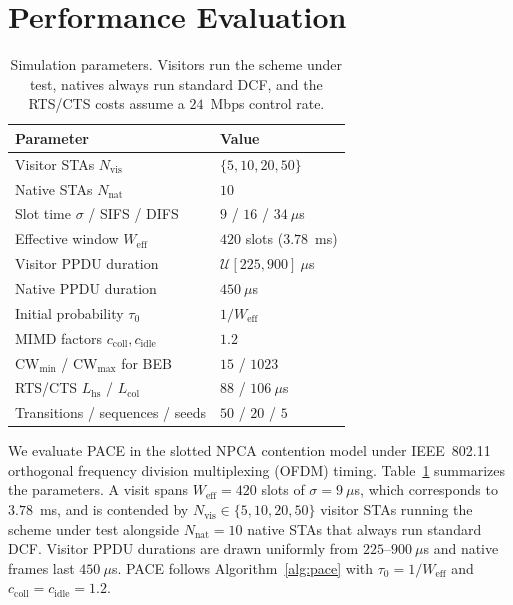 \documentclass[a4paper,fleqn]{cas-dc}
\newcommand{\Nvis}{N_\mathrm{vis}}
\newcommand{\Nnat}{N_\mathrm{nat}}
\begin{document}
\section{Performance Evaluation}
\label{sec:performance_evaluation}

\begin{table}
\centering
\caption{Simulation parameters. Visitors run the scheme under test, natives always run standard DCF, and the RTS/CTS costs assume a $24$~Mbps control rate.}
\label{tab:sim_params}
\begin{tabular}{ll}
\hline
\textbf{Parameter} & \textbf{Value} \\
\hline
Visitor STAs $\Nvis$ & $\{5, 10, 20, 50\}$ \\
Native STAs $\Nnat$ & $10$ \\
Slot time $\sigma$ / SIFS / DIFS  & $9$ / $16$ / $34~\mu$s \\
Effective window $W_\mathrm{eff}$ & $420$ slots ($3.78$~ms) \\
Visitor PPDU duration            & $\mathcal{U}[225, 900]~\mu$s \\
Native PPDU duration             & $450~\mu$s \\
Initial probability $\tau_0$     & $1/W_\mathrm{eff}$ \\
MIMD factors $c_\mathrm{coll},c_\mathrm{idle}$ & $1.2$ \\
$\mathrm{CW}_{\min}$ / $\mathrm{CW}_{\max}$ for BEB & $15$ / $1023$ \\
RTS/CTS $L_\mathrm{hs}$ / $L_\mathrm{col}$ & $88$ / $106~\mu$s \\
Transitions / sequences / seeds & $50$ / $20$ / $5$ \\
\hline
\end{tabular}
\end{table}

We evaluate PACE in the slotted NPCA contention model under IEEE~802.11 orthogonal frequency division multiplexing (OFDM) timing. Table~\ref{tab:sim_params} summarizes the parameters. A visit spans $W_\mathrm{eff}=420$ slots of $\sigma=9~\mu$s, which corresponds to $3.78$~ms, and is contended by $\Nvis\in\{5,10,20,50\}$ visitor STAs running the scheme under test alongside $\Nnat=10$ native STAs that always run standard DCF. Visitor PPDU durations are drawn uniformly from $225$--$900~\mu$s and native frames last $450~\mu$s. PACE follows Algorithm~\ref{alg:pace} with $\tau_0=1/W_\mathrm{eff}$ and $c_\mathrm{coll}=c_\mathrm{idle}=1.2$. 
\end{document}
